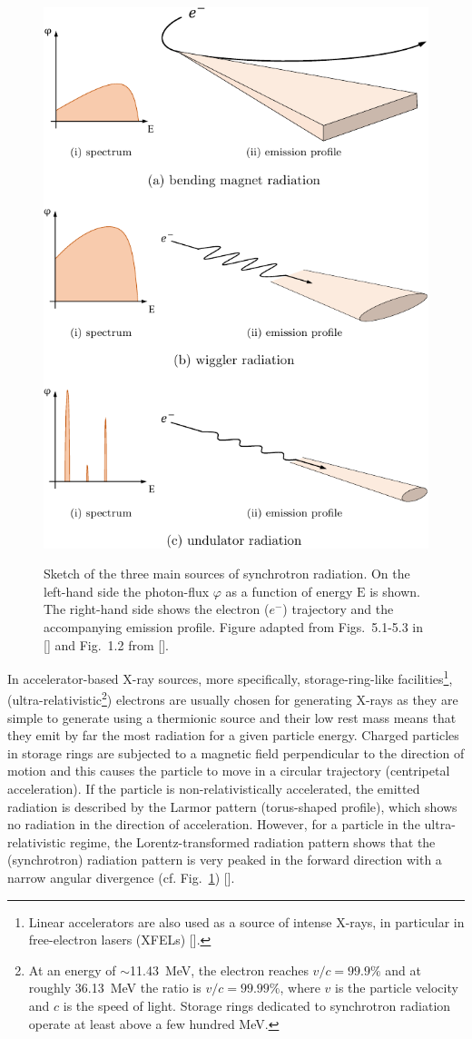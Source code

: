 \begin{refsection}
\begin{figure}[t]
    \centering
    {\includegraphics[width=.55\linewidth]{figures/ch02/x-ray_sources.pdf}}
    \caption[Synchrotron radiation emission]{Sketch of the three main sources of synchrotron radiation. On the left-hand side the photon-flux $\varphi$ as a function of energy $\mathrm{E}$ is shown. The right-hand side shows the electron ($e^-$) trajectory and the accompanying emission profile. Figure adapted from Figs.~5.1-5.3 in [\cite{Attwood1999}] and Fig.~1.2 from [\cite{Clarke2004}].}
    \label{fig:emission}
\end{figure}

In accelerator-based X-ray sources, more specifically, storage-ring-like facilities\footnote{Linear accelerators are also used as a source of intense X-rays, in particular in free-electron lasers (XFELs) [\cite{Huang2007}].}, (ultra-relativistic\footnote{At an energy of $\sim$11.43~MeV, the electron reaches $v/c = 99.9\%$ and at roughly 36.13~MeV the ratio is $v/c = 99.99\%$, where $v$ is the particle velocity and $c$ is the speed of light. Storage rings dedicated to synchrotron radiation operate at least above a few hundred MeV.}) electrons are usually chosen for generating X-rays as they are simple to generate using a thermionic source and their low rest mass means that they emit by far the most radiation for a given particle energy. Charged particles in storage rings are subjected to a magnetic field perpendicular to the direction of motion and this causes the particle to move in a circular trajectory (centripetal acceleration). If the particle is non-relativistically accelerated, the emitted radiation is described by the Larmor pattern (torus-shaped profile), which shows no radiation in the direction of acceleration. However, for a particle in the ultra-relativistic regime, the Lorentz-transformed radiation pattern shows that the (synchrotron) radiation pattern is very peaked in the forward direction with a narrow angular divergence (cf. Fig.~\ref{fig:emission}) [\cite{Jackson1998}].


\end{refsection}
